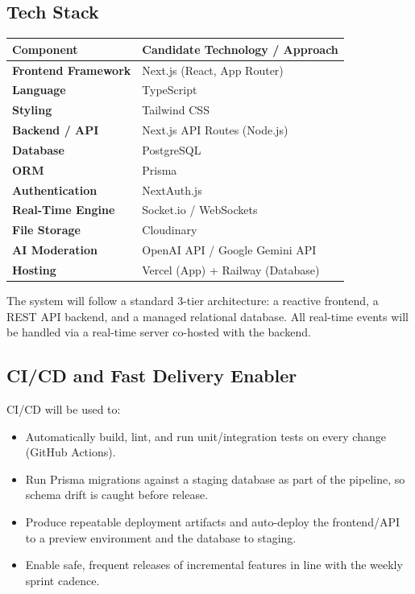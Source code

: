 \documentclass[11pt,a4paper]{article}
\begin{document}
\subsection{Tech Stack}
\begin{longtable}{>{\bfseries}p{4.5cm} p{8.5cm}}
\toprule
Component & Candidate Technology / Approach \\
\midrule
\endhead
Frontend Framework & Next.js (React, App Router) \\
Language & TypeScript \\
Styling & Tailwind CSS \\
Backend / API & Next.js API Routes (Node.js) \\
Database & PostgreSQL \\
ORM & Prisma \\
Authentication & NextAuth.js \\
Real-Time Engine & Socket.io / WebSockets \\
File Storage & Cloudinary \\
AI Moderation & OpenAI API / Google Gemini API \\
Hosting & Vercel (App) + Railway (Database) \\
\bottomrule
\end{longtable}

The system will follow a standard 3-tier architecture: a reactive frontend, a REST API backend, and a managed relational database. All real-time events will be handled via a real-time server co-hosted with the backend.

\subsection{CI/CD and Fast Delivery Enabler}
CI/CD will be used to:
\begin{itemize}[leftmargin=0.7cm]
    \item Automatically build, lint, and run unit/integration tests on every change (GitHub Actions).
    \item Run Prisma migrations against a staging database as part of the pipeline, so schema drift is caught before release.
    \item Produce repeatable deployment artifacts and auto-deploy the frontend/API to a preview environment and the database to staging.
    \item Enable safe, frequent releases of incremental features in line with the weekly sprint cadence.
\end{itemize}
\end{document}
